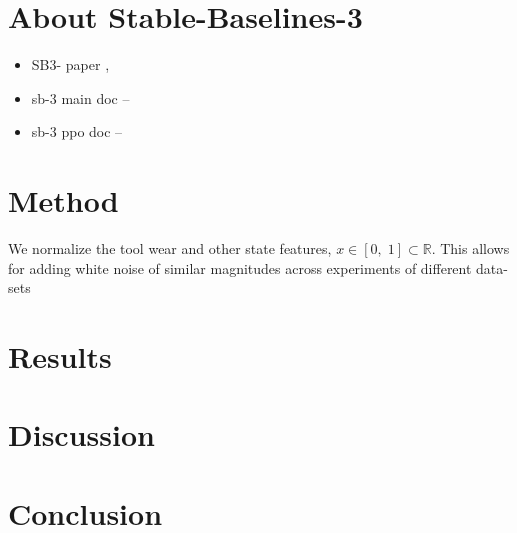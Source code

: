 \documentclass[]{article}
\begin{document}
\section{About Stable-Baselines-3}
\begin{itemize}
	\item SB3- paper \citep{SB3}, \cite{SB3}
	\item sb-3 main doc -- \citep{SB3-main-doc}
	\item sb-3 ppo doc -- \citep{SB3-PPO-doc}
\end{itemize}

\section{Method}

We normalize the tool wear and other state features, $x \in [0,\;1] \subset \mathbb{R} $. This allows for adding white noise of similar magnitudes across experiments of different data-sets

\section{Results}



\section{Discussion}

\section{Conclusion}



\end{document}

